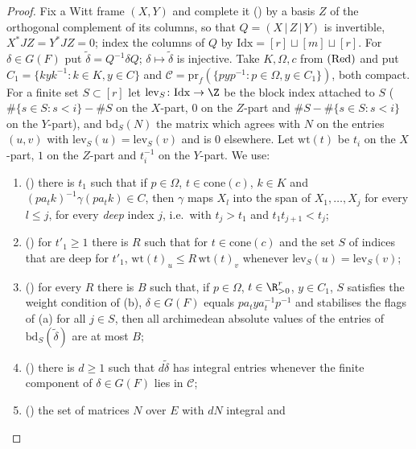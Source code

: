 \begin{proof}
Fix a Witt frame $(X,Y)$ and complete it () by a basis $Z$ of the
orthogonal complement of its columns, so that $Q=(X\,|\,Z\,|\,Y)$ is invertible, $X^*JZ=Y^*JZ=0$; index the columns of $Q$
by $\mathrm{Idx}=[r]\sqcup[m]\sqcup[r]$. For $\delta\in G(F)$ put $\tilde\delta=Q^{-1}\delta Q$; $\delta\mapsto\tilde\delta$
is injective. Take $K,\Omega,c$ from $\textup{(Red)}$ and put $C_1=\{kyk^{-1}:k\in K,y\in C\}$ and
$\mathcal C=\mathrm{pr}_f(\{pyp^{-1}:p\in\Omega,y\in C_1\})$, both compact. For a finite set $S\subset[r]$ let
$\mathrm{lev}_S\colon\mathrm{Idx}\to\Z$ be the block index attached to $S$ ($\#\{s\in S:s<i\}-\#S$ on the $X$-part, $0$ on
the $Z$-part and $\#S-\#\{s\in S:s<i\}$ on the $Y$-part), and $\mathrm{bd}_S(N)$ the matrix which agrees with $N$ on the
entries $(u,v)$ with $\mathrm{lev}_S(u)=\mathrm{lev}_S(v)$ and is $0$ elsewhere. Let $\mathrm{wt}(t)$ be $t_i$ on the $X$-part,
$1$ on the $Z$-part and $t_i^{-1}$ on the $Y$-part. We use:
\begin{enumerate}[label=(\alph*)]
\item () there is $t_1$ such that if $p\in\Omega$,
$t\in\mathrm{cone}(c)$, $k\in K$ and $(pa_tk)^{-1}\gamma(pa_tk)\in C$, then $\gamma$ maps $X_l$ into the span of
$X_1,\dots,X_j$ for every $l\le j$, for every \emph{deep} index $j$, i.e.\ with $t_j>t_1$ and $t_1t_{j+1}<t_j$;
\item () for $t'_1\ge1$ there is $R$ such that for $t\in\mathrm{cone}
(c)$ and the set $S$ of indices that are deep for $t'_1$, $\mathrm{wt}(t)_u\le R\,\mathrm{wt}(t)_v$ whenever
$\mathrm{lev}_S(u)=\mathrm{lev}_S(v)$;
\item () for every $R$ there is $B$ such that, if $p\in\Omega$,
$t\in\R^r_{>0}$, $y\in C_1$, $S$ satisfies the weight condition of (b), $\delta\in G(F)$ equals $pa_tya_t^{-1}p^{-1}$ and
stabilises the flags of (a) for all $j\in S$, then all archimedean absolute values of the entries of
$\mathrm{bd}_S(\tilde\delta)$ are at most $B$;
\item () there is $d\ge1$ such that $d\tilde\delta$ has
integral entries whenever the finite component of $\delta\in G(F)$ lies in $\mathcal C$;
\item () the set of matrices $N$ over $E$ with $dN$ integral and

\end{enumerate}
\end{proof}
